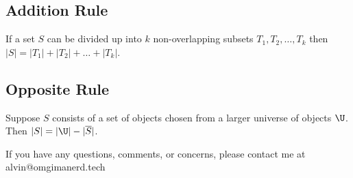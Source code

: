 \documentclass[letterpaper, 12pt]{math}
\begin{document}
\subsection*{Addition Rule}
If a set \( S \) can be divided up into \( k \) non-overlapping subsets
\( T_{1},T_{2},\dots,T_{k} \) then \( |S| = |T_{1}|+|T_{2}|+\dots+|T_{k}| \).

\subsection*{Opposite Rule}
Suppose \( S \) consists of a set of objects chosen from a larger universe of
objects \( \U \). Then \( |S| = |\U|-|\overline{S}| \).

\begin{center}
  If you have any questions, comments, or concerns, please contact me at
  alvin@omgimanerd.tech
\end{center}
\end{document}
